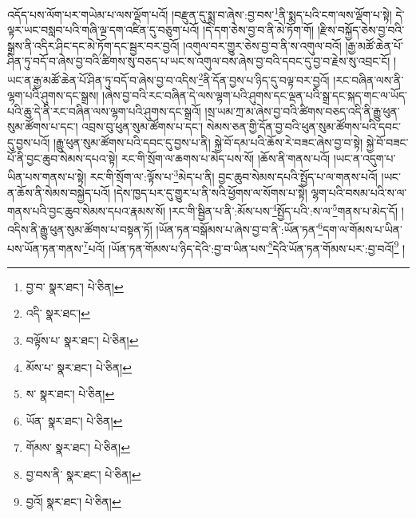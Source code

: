 འདོད་པས་ལོག་པར་གཡེམ་པ་ལས་ལྡོག་པའོ། །བརྫུན་དུ་སྨྲ་བ་ཞེས་:བྱ་བས་\footnote{བྱ་བ་  སྣར་ཐང་།  པེ་ཅིན། }ནི་སྨད་པའི་ངག་ལས་ལྡོག་པ་སྟེ། དེ་ལྟར་ཡང་བསླབ་པའི་གཞི་ལྔ་དག་འཛིན་དུ་བཅུག་པའོ། །དེ་དག་ཅེས་བྱ་བ་ནི་མེ་ཏོག་གོ། །རྫིས་བསྐྱོད་ཅེས་བྱ་བའི་སྒྲས་ནི་འདིར་ཤིང་དང་མེ་ཏོག་དང་སྦྱར་བར་བྱའོ། །འགུལ་བར་གྱུར་ཅེས་བྱ་བ་ནི་ས་འགུལ་བའོ། །རྒྱ་མཚོ་ཆེན་པོ་ཤིན་ཏུ་བདོ་བ་ཞེས་བྱ་བའི་ཚིགས་སུ་བཅད་པ་ཡང་ས་འགུལ་བས་ཞེས་བྱ་བའི་དབང་དུ་བྱ་བ་རྗེས་སུ་འབྲང་ངོ། །ཡང་ན་རྒྱ་མཚོ་ཆེན་པོ་ཤིན་ཏུ་བདོ་བ་ཞེས་བྱ་བ་འདིས་\footnote{འདི་  སྣར་ཐང་། }ནི་དོན་བྱས་པ་ཉིད་དུ་བལྟ་བར་བྱའོ། །རང་བཞིན་ལས་ནི་ལྷག་པའི་ཤུགས་དང་སྒྲས། །ཞེས་བྱ་བའི་རང་བཞིན་དེ་ལས་ལྷག་པའི་ཤུགས་དང་ལྡན་པའི་སྒྲ་དང་སྐད་གང་ལ་ཡོད་པའི་ཆུ་དེ་ནི་རང་བཞིན་ལས་ལྷག་པའི་ཤུགས་དང་སྒྲའོ། །སྲ་ཡམ་ཀྲ་མ་ཞེས་བྱ་བའི་ཚིགས་བཅད་འདི་ནི་རྒྱུ་ཕུན་སུམ་ཚོགས་པ་དང་། འབྲས་བུ་ཕུན་སུམ་ཚོགས་པ་དང་། སེམས་ཅན་གྱི་དོན་བྱ་བའི་ཕུན་སུམ་ཚོགས་པའི་དབང་དུ་བྱས་པའོ། །རྒྱུ་ཕུན་སུམ་ཚོགས་པའི་དབང་དུ་བྱས་པ་ནི། སྐྱེ་བོ་དམ་པའི་ཆོས་རེ་བཟང་ཞེས་བྱ་བ་སྟེ། སྐྱེ་བོ་བཟང་པོ་ནི་བྱང་ཆུབ་སེམས་དཔའ་སྟེ། རང་གི་སྲོག་ལ་ཆགས་པ་མེད་པས་སོ། །ཆོས་ནི་གནས་པའོ། །ཡང་ན་འདུག་པ་ཡིན་པས་གནས་པ་སྟེ། རང་གི་སྲོག་ལ་:ལྟོས་པ་\footnote{བལྟོས་པ་  སྣར་ཐང་།  པེ་ཅིན། }མེད་པ་ནི། བྱང་ཆུབ་སེམས་དཔའི་སྤྱོད་པ་ལ་གནས་པའོ། །ཡང་ན་ཆོས་ནི་སེམས་བསྐྱེད་པའོ། །དེས་ཁྱད་པར་དུ་གྱུར་པ་ནི་སའི་ཕྱོགས་ལ་སོགས་པ་སྟེ། ལྷག་པའི་བསམ་པའི་ས་ལ་གནས་པའི་བྱང་ཆུབ་སེམས་དཔའ་རྣམས་སོ། །རང་གི་སྦྱིན་པ་ནི་:མོས་པས་\footnote{མོས་པ་  སྣར་ཐང་།  པེ་ཅིན། }སྤྱོད་པའི་:ས་ལ་\footnote{ས་  སྣར་ཐང་།  པེ་ཅིན། }གནས་པ་མེད་དོ། །འདིས་ནི་རྒྱུ་ཕུན་སུམ་ཚོགས་པ་བསྟན་ཏོ། །ཡོན་ཏན་བསྒོམས་པ་ཞེས་བྱ་བ་ནི་:ཡོན་ཏན་\footnote{ཡོན་  སྣར་ཐང་།  པེ་ཅིན། }དག་ལ་གོམས་པ་ཡིན་པས་ཡོན་ཏན་གནས་\footnote{གོམས་  སྣར་ཐང་།  པེ་ཅིན། }པའོ། །ཡོན་ཏན་གོམས་པ་ཉིད་དེའི་:བྱ་བ་ཡིན་པས་\footnote{བྱ་བས་ནི་  སྣར་ཐང་།  པེ་ཅིན། }དེའི་ཡོན་ཏན་གོམས་པར་:བྱ་བའོ།\footnote{བྱའོ།  སྣར་ཐང་།  པེ་ཅིན། } །
